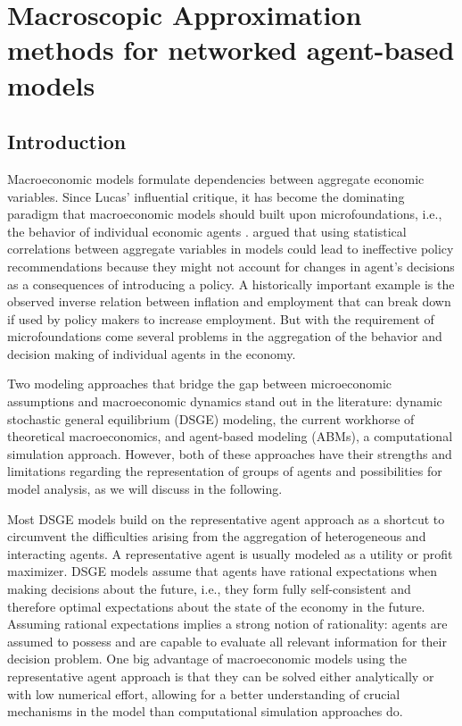 \chapter{Macroscopic Approximation methods for networked agent-based models}
\section{Introduction}
\label{sec:intro}

Macroeconomic models formulate dependencies between aggregate economic variables.
Since Lucas' influential critique, it has become the dominating paradigm that macroeconomic models should built upon microfoundations, i.e., the behavior of individual economic agents \citep{Janssen2016}.
\citet{Lucas1976} argued that using statistical correlations between aggregate variables in models could lead to ineffective policy recommendations because they might not account for changes in agent's decisions as a consequences of introducing a policy.
A historically important example is the observed inverse relation between inflation and employment that can break down if used by policy makers to increase employment.
But with the requirement of microfoundations come several problems in the aggregation of the behavior and decision making of individual agents in the economy.

Two modeling approaches that bridge the gap between microeconomic assumptions and macroeconomic dynamics stand out in the literature: dynamic stochastic general equilibrium (DSGE) modeling, the current workhorse of theoretical macroeconomics, and agent-based modeling (ABMs), a computational simulation approach.
However, both of these approaches have their strengths and limitations regarding the representation of groups of agents and possibilities for model analysis, as we will discuss in the following.

Most DSGE models build on the representative agent approach as a shortcut to circumvent the difficulties arising from the aggregation of heterogeneous and interacting agents.
A representative agent is usually modeled as a utility or profit maximizer.
DSGE models assume that agents have rational expectations when making decisions about the future, i.e., they form fully self-consistent and therefore optimal expectations about the  state of the economy in the future.
Assuming rational expectations implies a strong notion of rationality: agents are assumed to possess and are capable to evaluate all relevant information for their decision problem.
One big advantage of macroeconomic models using the representative agent approach is that they can be solved either analytically or with low numerical effort, allowing for a better understanding of crucial mechanisms in the model than computational simulation approaches do.

